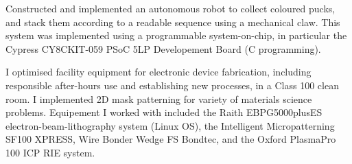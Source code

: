 \documentclass[10pt,a4paper,ragged2e,withhyper]{altacv}
\begin{document}
		\newpage


		Constructed and implemented an autonomous robot to collect coloured pucks, and stack them according to a readable sequence using a mechanical claw.
		This system was implemented using a programmable system-on-chip, in particular the Cypress CY8CKIT-059 PSoC 5LP Developement Board (C programming).

		\divider

		I optimised facility equipment for electronic device fabrication, including responsible after-hours use and establishing new processes, in a Class 100 clean room.
		I implemented 2D mask patterning for variety of materials science problems.
		Equipement I worked with included the Raith EBPG5000plusES electron-beam-lithography system (Linux OS), 
		the Intelligent Micropatterning SF100 XPRESS, Wire Bonder Wedge FS Bondtec, and the Oxford PlasmaPro 100 ICP RIE system.


\end{document}

